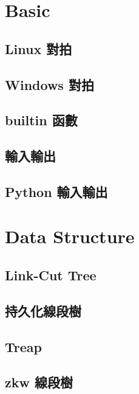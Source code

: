 \documentclass[a4paper,10pt,twocolumn,oneside]{article}
\begin{document}
\pagestyle{fancy}
\fancyfoot{}
\fancyhead[R]{\thepage}
\renewcommand{\headrulewidth}{0.4pt}
\renewcommand{\contentsname}{Contents} 

\scriptsize
\tableofcontents
\section{Basic}
\subsection{Linux 對拍}

\subsection{Windows 對拍}

\subsection{builtin 函數}

\subsection{輸入輸出}

\subsection{Python 輸入輸出}


\section{Data Structure}
\subsection{Link-Cut Tree}

\subsection{持久化線段樹}

\subsection{Treap}

\subsection{zkw 線段樹}

\end{document}

